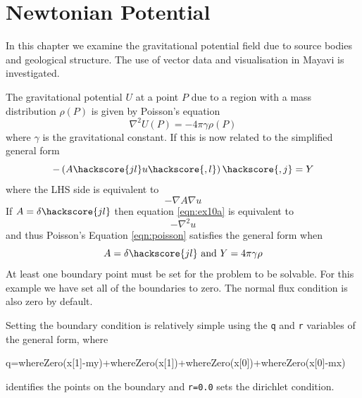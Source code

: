 
%
%
%

\section{Newtonian Potential}

In this chapter we examine the gravitational potential field due to source
bodies and geological structure. The use of vector data and visualisation in
Mayavi is investigated.

The gravitational potential $U$ at a point $P$ due to a region with a mass
distribution $\rho(P)$ is given by Poisson's equation
\begin{equation} \label{eqn:poisson}
\nabla^2 U(P) = -4\pi\gamma\rho(P)
\end{equation}
where $\gamma$ is the gravitational constant.
If this is now related to the simplified general form
\begin{equation}
-\left(A\hackscore{jl} u\hackscore{,l} \right)\hackscore{,j} = Y
\end{equation}
where the LHS side is equivalent to 
\begin{equation} \label{eqn:ex10a}
-\nabla A \nabla u
\end{equation}
If $A=\delta\hackscore{jl}$ then equation \ref{eqn:ex10a} is equivalent to
\begin{equation*}
-\nabla^2 u
\end{equation*}
and thus Poisson's Equation \ref{eqn:poisson} satisfies the general form when
\begin{equation}
A=\delta\hackscore{jl} \text{ and } Y= 4\pi\gamma\rho
\end{equation}
At least one boundary point must be set for the problem to be solvable. For this
example we have set all of the boundaries to zero. The normal flux condition is
also zero by default. 

Setting the boundary condition is relatively simple using the \verb!q! and
\verb!r! variables of the general form, where
\begin{python}
q=whereZero(x[1]-my)+whereZero(x[1])+whereZero(x[0])+whereZero(x[0]-mx)
\end{python}
identifies the points on the boundary and \verb!r=0.0! sets the dirichlet
condition.

